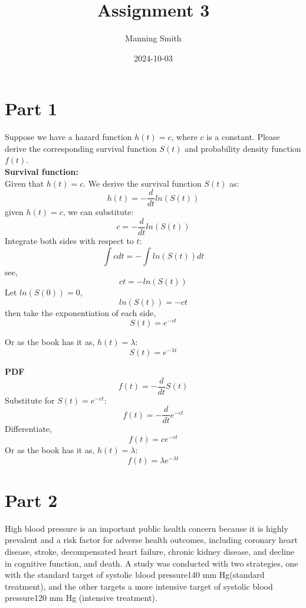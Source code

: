 \documentclass[
]{article}
\title{Assignment 3}
\author{Manning Smith}
\date{2024-10-03}
\begin{document}
\maketitle

\section{Part 1}\label{part-1}

Suppose we have a hazard function \(h(t)=c\), where \(c\) is a constant.
Please derive the corresponding survival function \(S(t)\) and
probability density function \(f(t)\).\\

\textbf{Survival function:}\\
Given that \(h(t)=c\). We derive the survival function \(S(t)\) as: \[
  h(t) = -\frac{d}{dt}ln(S(t))
\] given \(h(t)=c\), we can substitute: \[
  c = -\frac{d}{dt}ln(S(t))
\] Integrate both sides with respect to \(t\): \[
  \int c dt = - \int ln(S(t)) dt
\] see, \[
  ct = - ln(S(t))
\] Let \(ln(S(0))=0\), \[
  ln(S(t)) = -ct
\] then take the exponentiation of each side, \[
  S(t) = e^{-ct}
\]

Or as the book has it as, \(h(t)=\lambda\): \[
  S(t) = e^{-\lambda t}
\]

\textbf{PDF}\\
\[
  f(t) =  -\frac{d}{dt} S(t)
\] Substitute for \(S(t)=e^{-ct}\): \[
  f(t) =  -\frac{d}{dt} e^{-ct}
\] Differentiate, \[
  f(t) = ce^{-ct}
\] Or as the book has it as, \(h(t)=\lambda\): \[
  f(t) = \lambda e^{-\lambda t}
\]

\newpage

\section{Part 2}\label{part-2}

High blood pressure is an important public health concern because it is
highly prevalent and a risk factor for adverse health outcomes,
including coronary heart disease, stroke, decompensated heart failure,
chronic kidney disease, and decline in cognitive function, and death. A
study was conducted with two strategies, one with the standard target of
systolic blood pressure140 mm Hg(standard treatment), and the other
targets a more intensive target of systolic blood pressure120 mm Hg
(intensive treatment).
\end{document}
